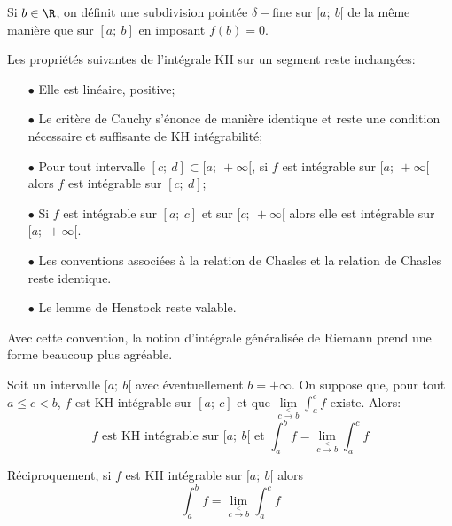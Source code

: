\begin{de}[Jauge pour un intervalle $[a;~b[$]
Si $b\in \R$, on définit une subdivision pointée $\delta-$fine sur $[a;~b[$ de la même manière que sur $[a;~b]$ en imposant $f(b)=0$.
\end{de}


\begin{prop}
Les propriétés suivantes de l'intégrale KH sur un segment reste inchangées:
\begin{itemize}
\item[$\bullet$]
Elle est linéaire, positive;
\item[$\bullet$]
Le critère de Cauchy s'énonce de manière identique et reste une condition nécessaire et suffisante de KH intégrabilité;
\item[$\bullet$]
Pour tout intervalle $[c;~d] \subset [a;~+\infty[$, si $f$ est intégrable sur $[a;~+\infty[$ alors $f$ est intégrable sur $[c;~d]$;
\item[$\bullet$]
Si $f$ est intégrable sur $[a;~c]$ et sur $[c;~+\infty[$ alors elle est intégrable sur $[a;~+\infty[$.
\item[$\bullet$]
Les conventions associées à la relation de Chasles et la relation de Chasles reste identique.
\item[$\bullet$]
Le lemme de Henstock reste valable.
\end{itemize}
\end{prop}

Avec cette convention, la notion d'intégrale généralisée de Riemann prend une forme beaucoup plus agréable.

\begin{prop}
Soit un intervalle $[a;~b[$ avec éventuellement $b = +\infty$. On suppose que, pour tout $a \leq c < b$, $f$ est KH-intégrable sur $[a;~c]$ et que $\lim \limits_{c \overset{<}{\to} b} \int_a^c f$ existe. Alors:
\[
f \text{ est KH intégrable sur $[a;~b[$ et }\int_a^b f = \lim \limits_{c \overset{<}{\to} b} \int_a^c f
\]

Réciproquement, si $f$ est KH intégrable sur $[a;~b[$ alors
\[
\int_a^b f = \lim \limits_{c \overset{<}{\to} b} \int_a^c f
\]
\end{prop}

